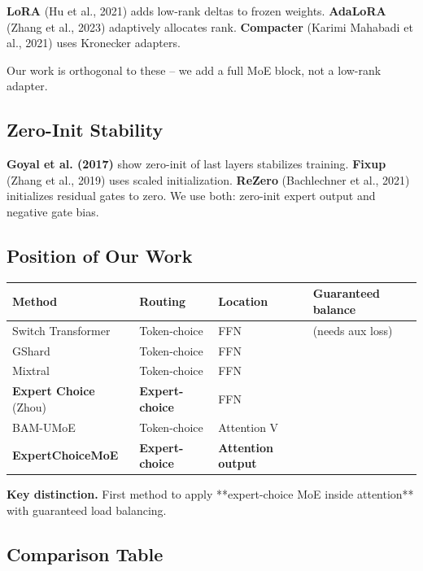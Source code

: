 \textbf{LoRA} (Hu et al., 2021) adds low-rank deltas to frozen weights. 
\textbf{AdaLoRA} (Zhang et al., 2023) adaptively allocates rank. \textbf{Compacter} 
(Karimi Mahabadi et al., 2021) uses Kronecker adapters.

Our work is orthogonal to these -- we add a full MoE block, not a low-rank 
adapter.

\subsection{Zero-Init Stability}

\textbf{Goyal et al. (2017)} show zero-init of last layers stabilizes training. 
\textbf{Fixup} (Zhang et al., 2019) uses scaled initialization. \textbf{ReZero} 
(Bachlechner et al., 2021) initializes residual gates to zero. We use both: 
zero-init expert output and negative gate bias.

\subsection{Position of Our Work}

\begin{table}[H]
\centering
\small
\begin{tabular}{llll}
\toprule
\textbf{Method} & \textbf{Routing} & \textbf{Location} & \textbf{Guaranteed balance} \\
\midrule
Switch Transformer & Token-choice & FFN & (needs aux loss) \\
GShard & Token-choice & FFN &  \\
Mixtral & Token-choice & FFN &  \\
\textbf{Expert Choice} (Zhou) & \textbf{Expert-choice} & FFN &  \\
BAM-UMoE & Token-choice & Attention V &  \\
\textbf{ExpertChoiceMoE} & \textbf{Expert-choice} & \textbf{Attention output} &  \\
\bottomrule
\end{tabular}
\end{table}

\textbf{Key distinction.} First method to apply **expert-choice MoE inside 
attention** with guaranteed load balancing.



\subsection{Comparison Table}

